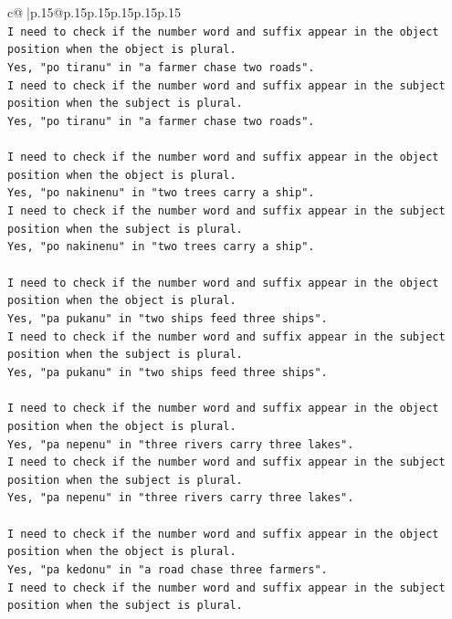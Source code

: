 \documentclass{article}
\begin{document}
{\begin{supertabular}{c@{$\;$}|p{.15\linewidth}@{}p{.15\linewidth}p{.15\linewidth}p{.15\linewidth}p{.15\linewidth}p{.15\linewidth}}
{{{\\ 
\texttt{I need to check if the number word and suffix appear in the object position when the object is plural.} \\
\texttt{Yes, "po tiranu" in "a farmer chase two roads".} \\
\texttt{I need to check if the number word and suffix appear in the subject position when the subject is plural.} \\
\texttt{Yes, "po tiranu" in "a farmer chase two roads".} \\
\\ 
\texttt{I need to check if the number word and suffix appear in the object position when the object is plural.} \\
\texttt{Yes, "po nakinenu" in "two trees carry a ship".} \\
\texttt{I need to check if the number word and suffix appear in the subject position when the subject is plural.} \\
\texttt{Yes, "po nakinenu" in "two trees carry a ship".} \\
\\ 
\texttt{I need to check if the number word and suffix appear in the object position when the object is plural.} \\
\texttt{Yes, "pa pukanu" in "two ships feed three ships".} \\
\texttt{I need to check if the number word and suffix appear in the subject position when the subject is plural.} \\
\texttt{Yes, "pa pukanu" in "two ships feed three ships".} \\
\\ 
\texttt{I need to check if the number word and suffix appear in the object position when the object is plural.} \\
\texttt{Yes, "pa nepenu" in "three rivers carry three lakes".} \\
\texttt{I need to check if the number word and suffix appear in the subject position when the subject is plural.} \\
\texttt{Yes, "pa nepenu" in "three rivers carry three lakes".} \\
\\ 
\texttt{I need to check if the number word and suffix appear in the object position when the object is plural.} \\
\texttt{Yes, "pa kedonu" in "a road chase three farmers".} \\
\texttt{I need to check if the number word and suffix appear in the subject position when the subject is plural.} \\
}}}
\end{supertabular}}
\end{document}
